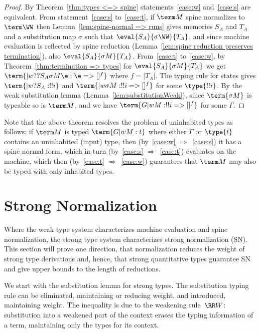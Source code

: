 \documentclass[a4paper,UKenglish,cleveref, autoref, thm-restate]{lipics-v2021}
\begin{document}
\begin{proof}
By Theorem~\ref{thm:types <=> spine} statements~\ref{case:w} and~\ref{case:s} are equivalent. From statement~\ref{case:s} to~\ref{case:t}, if $\term M$ spine normalizes to $\term\WW$ then Lemma~\ref{lem:spine-normal => runs} gives memories $S_A$ and $T_A$ and a substitution map $\sigma$ such that $\eval{S_A}{\sigma\WW}{T_A}$, and since machine evaluation is reflected by spine reduction (Lemma~\ref{lem:spine reduction preserves termination}), also $\eval{S_A}{\sigma M}{T_A}$. From~\ref{case:t} to~\ref{case:w}, by Theorem~\ref{thm:termination => types} for $\eval{S_A}{\sigma M}{T_A}$ we get $\term{|w ??{S_A}{\sigma M}\e : \e=>[]^f}$ where $f=|T_A|$. The typing rule for states gives $\term{|w ?{S_A}:!!i}$ and $\term{|w \sigma M: !!i => []^f}$ for some $\type{!!i}$. By the weak substitution lemma (Lemma~\ref{lem:substitutionWeak}), since $\term{\sigma M}$ is typeable so is $\term M$, and we have $\term{G |w M: !!i => []^f}$ for some $\Gamma$.
\end{proof}

Note that the above theorem resolves the problem of uninhabited types as follows: if $\term M$ is typed $\term{G |w M:t}$ where either $\Gamma$ or $\type{t}$ contains an uninhabited (input) type, then (by~\ref{case:w} $\Rightarrow$~\ref{case:s}) it has a spine normal form, which in turn (by~\ref{case:s} $\Rightarrow$~\ref{case:t}) evaluates on the machine, which then (by~\ref{case:t} $\Rightarrow$~\ref{case:w}) guarantees that $\term M$ may also be typed with only inhabited types. 


\section{Strong Normalization}
\label{sec:SN}

Where the weak type system characterizes machine evaluation and spine normalization, the strong type system characterizes strong normalization (SN). This section will prove one direction, that normalization reduces the weight of strong type derivations and, hence, that strong quantitative types guarantee SN and give upper bounds to the length of reductions. 

We start with the substitution lemma for strong types. The substitution typing rule can be eliminated, maintaining or reducing weight, and introduced, maintaining weight. The inequality is due to the weakening rule~$\RR W$: substitution into a weakened part of the context erases the typing information of a term, maintaining only the types for its context.
\end{document}
